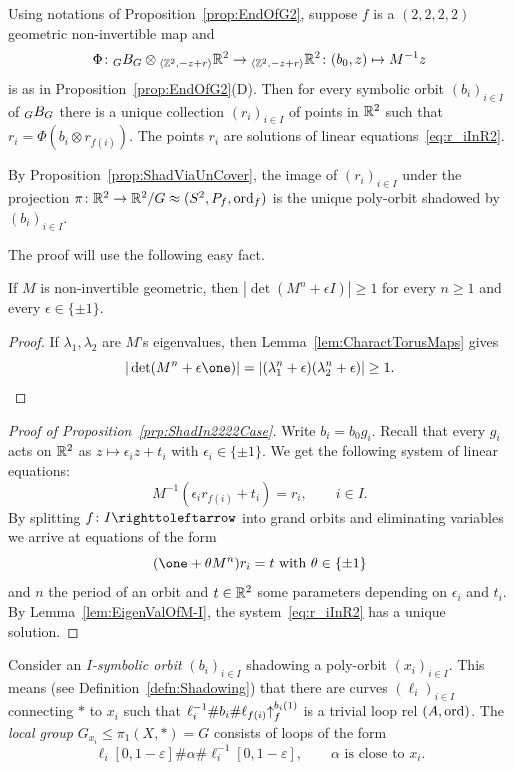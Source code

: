 \documentclass{amsart}
\begin{document}
\begin{prop}\label{prp:ShadIn2222Case}
  Using notations of Proposition~\ref{prop:EndOfG2}, suppose $f$ is a
  $(2,2,2,2)$ geometric non-invertible map and
  \[\Phi\colon\subscript G B_G\otimes\subscript{\langle \Z^2,-z+r \rangle}{\R^2}\to\subscript{\langle \Z^2,-z+r \rangle}{\R^2}\colon(b_0, z)\mapsto M^{-1}z
  \]
  is as in Proposition~\ref{prop:EndOfG2}(D). Then for every symbolic
  orbit $(b_i)_{i\in I}$ of $\subscript G B_G$ there is a unique
  collection $(r_i)_{i\in I}$ of points in ${\mathbb R}^2$ such that
  $r_i= \Phi(b_i \otimes r_{f(i)})$.  The points $r_i$ are solutions
  of linear equations~\eqref{eq:r_iInR2}.
\end{prop}
By Proposition~\ref{prop:ShadViaUnCover}, the image of
$(r_i)_{i\in I}$ under the projection
$\pi\colon{\mathbb R}^2\to{\mathbb R}^2/G\approx (S^2,P_f,\operatorname{ord}_f)$ is the
unique poly-orbit shadowed by $(b_i)_{i\in I}$.

\noindent The proof will use the following easy fact.
\begin{lem}\label{lem:EigenValOfM-I}
  If $M$ is non-invertible geometric, then
  $|\det(M^n+\epsilon I)|\ge 1$ for every $n\ge 1$ and every
  $\epsilon\in\{\pm 1\}$.
\end{lem}
\begin{proof}
  If $\lambda_1,\lambda_2$ are $M$'s eigenvalues, then
  Lemma~\ref{lem:CharactTorusMaps} gives
 \[|\det(M^n+\epsilon\one)| = |(\lambda^n_1+\epsilon )(\lambda^n_2+\epsilon )| \ge 1.\qedhere\]
\end{proof}

\begin{proof}[Proof of Proposition~\ref{prp:ShadIn2222Case}]
  Write $b_i = b_0g_i$. Recall that every $g_i$ acts on ${\mathbb R}^2$ as
  $z\mapsto \epsilon_i z+ t_i$ with $\epsilon_i\in\{\pm 1\}.$ We get
  the following system of linear equations:
  \[M^{-1}(\epsilon_i r_{f(i)}+ t_i) = r_i,\qquad i\in I.
  \]
  By splitting $f\colon I\selfmap$ into grand orbits and eliminating
  variables we arrive at equations of the form
  \begin{equation}\label{eq:r_iInR2}
    (\one+\theta M^n) r_i = t\text{ with }\theta\in\{\pm 1\}
  \end{equation}
  and $n$ the period of an orbit and $t\in{\mathbb R}^2$ some parameters
  depending on $\epsilon_i$ and $t_i$. By
  Lemma~\ref{lem:EigenValOfM-I}, the system~\eqref{eq:r_iInR2} has a
  unique solution.
\end{proof}

Consider an \emph{$I$-symbolic orbit} $(b_i)_{i\in I}$ shadowing a
poly-orbit $(x_i)_{i\in I}$. This means (see
Definition~\ref{defn:Shadowing}) that there are curves
$(\ell_i)_{i\in I}$ connecting $*$ to $x_i$ such that
$\ell_i^{-1}\#b_i\#\ell_{f(i)} {\uparrow}_{f}^{b_i(1)}$ is a trivial loop
rel $(A,\operatorname{ord})$. The \emph{local group} $G_{x_i} \le \pi_1(X,*)=G$
consists of loops of the form
\begin{equation}
\label{eq:ell-1 alpha ell}
\ell_i[0,1-\varepsilon] \#\alpha\#\ell_i^{-1}[0,1-\varepsilon],\qquad\alpha \text{ is close to }x_i.
\end{equation}
\end{document}
